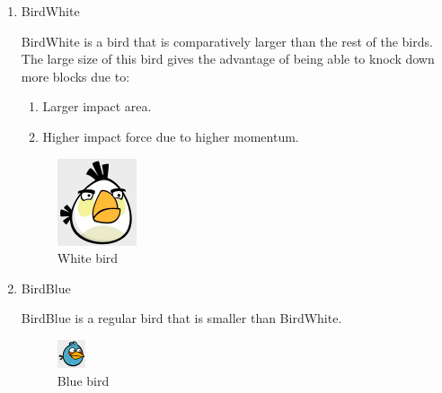 \documentclass{dalthesis}
\begin{document}
\begin{enumerate}
\begin{enumerate}
    \begin{enumerate}
      \item BirdWhite

      BirdWhite is a bird that is comparatively larger than the rest of the birds. The large size of this bird gives the advantage of being able to knock down more blocks due to:

      \begin{enumerate}
        \item Larger impact area.
        \item Higher impact force due to higher momentum.
      \end{enumerate}

      \begin{figure}[H]
				\caption{White bird}
        \includegraphics[width=.5\textwidth,keepaspectratio]{birds/white.png}
      \end{figure}

      \item BirdBlue

      BirdBlue is a regular bird that is smaller than BirdWhite.

      \begin{figure}[H]
				\caption{Blue bird}
        \includegraphics[width=.5\textwidth,keepaspectratio]{birds/blue.png}
      \end{figure}


\end{enumerate}
\end{enumerate}
\end{enumerate}
\end{document}
